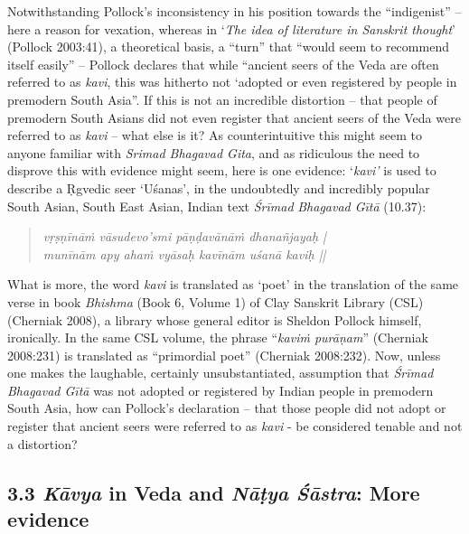 Notwithstanding Pollock’s inconsistency in his position towards the “indigenist” – here a reason for vexation, whereas in ‘\textit{The idea of literature in Sanskrit thought}’ (Pollock 2003:41), a theoretical basis, a “turn” that “would seem to recommend itself easily” – Pollock declares that while “ancient seers of the Veda are often referred to as \textit{kavi}, this was hitherto not ‘adopted or even registered by people in premodern South Asia”. If this is not an incredible distortion – that people of premodern South Asians did not even register that ancient seers of the Veda were referred to as \textit{kavi} – what else is it? As counterintuitive this might seem to anyone familiar with \textit{Srimad Bhagavad Gita}, and as ridiculous the need to disprove this with evidence might seem, here is one evidence: ‘\textit{kavi’} is used to describe a Ṛgvedic seer ‘Uśanas’, in the undoubtedly and incredibly popular South Asian, South East Asian, Indian text \textit{Śrīmad} \textit{Bhagavad Gītā} (10.37):

\begin{verse}
\textit{vṛṣṇīnāṁ vāsudevo’smi pāṇḍavānāṁ dhanañjayaḥ |}\\\textit{munīnām apy ahaṁ vyāsaḥ kavīnām uśanā kaviḥ ||}
\end{verse}

What is more, the word \textit{kavi} is translated as ‘poet’ in the translation of the same verse in book \textit{Bhishma} (Book 6, Volume 1) of Clay Sanskrit Library (CSL) (Cherniak 2008), a library whose general editor is Sheldon Pollock himself, ironically. In the same CSL volume, the phrase “\textit{kaviṁ purāṇam}” (Cherniak 2008:231) is translated as “primordial poet” (Cherniak 2008:232). Now, unless one makes the laughable, certainly unsubstantiated, assumption that \textit{Śrīmad} \textit{Bhagavad Gītā} was not adopted or registered by Indian people in premodern South Asia, how can Pollock’s declaration – that those people did not adopt or register that ancient seers were referred to as \textit{kavi} - be considered tenable and not a distortion?


\subsection*{3.3 \textit{Kāvya} in Veda and \textit{Nāṭya Śāstra}: More evidence}


